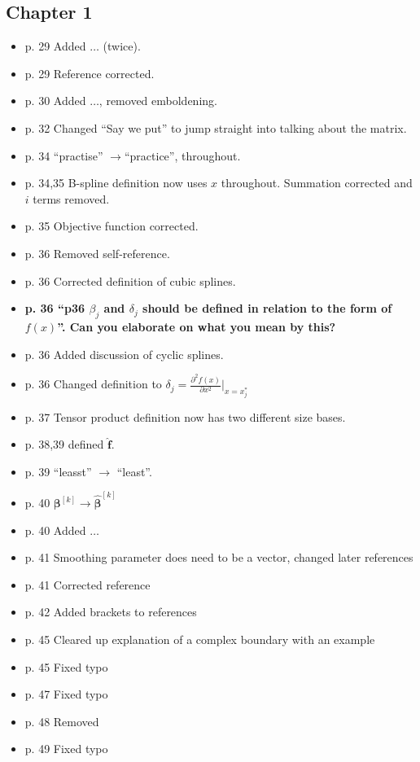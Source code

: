 \subsection{Chapter 1}
\begin{itemize}
\item p. 29 Added $\dots$ (twice).
\item p. 29 Reference corrected.
\item p. 30 Added $\dots$, removed emboldening.
\item p. 32 Changed ``Say we put'' to jump straight into talking about the matrix.
\item p. 34 ``practise'' $\rightarrow$``practice'', throughout.
\item p. 34,35 B-spline definition now uses $x$ throughout. Summation corrected and $i$ terms removed.
\item p. 35 Objective function corrected.
\item p. 36 Removed self-reference.
\item p. 36 Corrected definition of cubic splines.
\item \textbf{p. 36 ``p36 $\beta_j$ and $\delta_j$ should be defined in relation to the form of $f(x)$''. Can you elaborate on what you mean by this?}
\item p. 36 Added discussion of cyclic splines.
\item p. 36 Changed definition to $\delta_j = \frac{\partial^2 f(x)}{\partial x^2}\vert_{x=x_j^*}$
\item p. 37 Tensor product definition now has two different size bases.
\item p. 38,39 defined $\mathbf{\hat{f}}$.
\item p. 39 ``leasst'' $\rightarrow$ ``least''.
\item p. 40 $\bm{\beta}^{[k]} \rightarrow \bm{\hat{\beta}}^{[k]}$
\item p. 40 Added $\dots$
\item p. 41 Smoothing parameter does need to be a vector, changed later references
\item p. 41 Corrected reference
\item p. 42 Added brackets to references
\item p. 45 Cleared up explanation of a complex boundary with an example
\item p. 45 Fixed typo
\item p. 47 Fixed typo
\item p. 48 Removed
\item p. 49 Fixed typo
\end{itemize}

